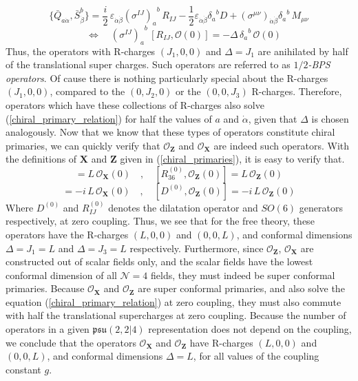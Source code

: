 \newpage
%
%
\begin{equation}\label{super conformal algebra 2}
\{ \bar{Q}_{a \dot{\alpha}}, \bar{S}^b_{\dot{\beta}} \}
=
\frac{i}{2} \, \varepsilon_{\dot{\alpha} \dot{\beta}} {(\sigma^{IJ})_a}^b \, R_{IJ}
- \frac{1}{2} \varepsilon_{\dot{\alpha} \dot{\beta}} {\delta_a}^b D
+ (\sigma^{\mu \nu})_{\dot{\alpha} \dot{\beta}} {\delta_a}^b \, M_{\mu \nu}
\end{equation}
%
%
\begin{equation}
\quad \Leftrightarrow \quad
%
{(\sigma^{IJ})_a}^b \, [R_{IJ}, \mathcal{O}(0)]
=
-\Delta \, {\delta_a}^b \, \mathcal{O}(0)
\end{equation}
%
%
Thus, the operators with R-charges $(J_1,0,0)$ and $\Delta = J_1$ are anihilated by half of the translational super charges. Such operators are referred to as \textit{$1/2$-BPS operators}. Of cause there is nothing particularly special about the R-charges $(J_1,0,0)$, compared to the $(0,J_2,0)$ or the $(0,0,J_3)$ R-charges. Therefore, operators which have these collections of R-charges also solve (\ref{chiral_primary_relation}) for half the values of $a$ and $\dot{\alpha}$, given that $\Delta$ is chosen analogously. Now that we know that these types of operators constitute chiral primaries, we can quickly verify that $\mathcal{O}_{\boldsymbol{Z}}$ and $\mathcal{O}_{\boldsymbol{X}}$ are indeed such operators. With the definitions of ${\boldsymbol{X}}$ and ${\boldsymbol{Z}}$ given in (\ref{chiral_primaries}), it is easy to verify that.
%
%
\begin{equation}
[R^{(0)}_{14}, \mathcal{O}_{\boldsymbol{X}}(0)] = L \, \mathcal{O}_{\boldsymbol{X}}(0)
%
\quad , \quad
%
[R^{(0)}_{36}, \mathcal{O}_{\boldsymbol{Z}}(0)] = L \, \mathcal{O}_{\boldsymbol{Z}}(0)
\end{equation}
%
%
\begin{equation}
[D^{(0)}, \mathcal{O}_{\boldsymbol{X}}(0)] = -i \, L \, \mathcal{O}_{\boldsymbol{X}}(0)
%
\quad , \quad
%
[D^{(0)}, \mathcal{O}_{\boldsymbol{Z}}(0)] = -i \, L \, \mathcal{O}_{\boldsymbol{Z}}(0)
\end{equation}
%
%
Where $D^{(0)}$ and $R^{(0)}_{IJ}$ denotes the dilatation operator and $SO(6)$ generators respectively, at zero coupling. Thus, we see that for the free theory, these operators have the R-charges $(L,0,0)$ and $(0,0,L)$, and conformal dimensions $\Delta = J_1 = L$ and $\Delta = J_3 = L$ respectively. Furthermore, since $\mathcal{O}_{\boldsymbol{Z}}$, $\mathcal{O}_{\boldsymbol{X}}$ are constructed out of scalar fields only, and the scalar fields have the lowest conformal dimension of all $\mathcal{N}=4$ fields, they must indeed be super conformal primaries. Because $\mathcal{O}_{\boldsymbol{X}}$ and $\mathcal{O}_{\boldsymbol{Z}}$ are super conformal primaries, and also solve the equation (\ref{chiral_primary_relation}) at zero coupling, they must also commute with half the translational supercharges at zero coupling. Because the number of operators in a given $\mathfrak{psu}(2,2|4)$ representation does not depend on the coupling, we conclude that the operators $\mathcal{O}_{\boldsymbol{X}}$ and $\mathcal{O}_{\boldsymbol{Z}}$ have R-charges $(L,0,0)$ and $(0,0,L)$, and conformal dimensions $\Delta = L$, for all values of the coupling constant $g$.\\
